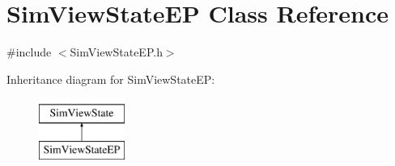 \hypertarget{class_sim_view_state_e_p}{\section{Sim\+View\+State\+E\+P Class Reference}
\label{class_sim_view_state_e_p}
}


{\ttfamily \#include $<$Sim\+View\+State\+E\+P.\+h$>$}

Inheritance diagram for Sim\+View\+State\+E\+P\+:\begin{figure}[H]
\begin{center}
\leavevmode
\includegraphics[height=2.000000cm]{class_sim_view_state_e_p}
\end{center}
\end{figure}
